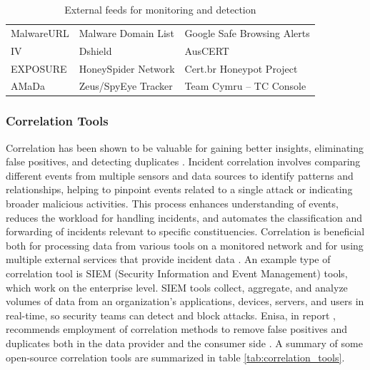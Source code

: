 \begin{table}[ht]
\caption{External feeds for monitoring and detection \cite{noauthor_proactive_nodate}}
\label{tab:detection-tools-ext}
\begin{tabularx}{\textwidth}{XXX}
    \hline
    MalwareURL &
    Malware Domain List &
    Google Safe Browsing Alerts \\
    IV &
    Dshield &
    AusCERT \\
    EXPOSURE &
    HoneySpider Network &
    Cert.br Honeypot Project \\
    AMaDa &
    Zeus/SpyEye Tracker &
    Team Cymru – TC Console \\
\end{tabularx}
\end{table}
\subsubsection{Correlation Tools}
Correlation has been shown to be valuable for gaining better insights, eliminating false positives, and detecting duplicates \cite{skopik_problem_2016}. 
Incident correlation involves comparing different events from multiple sensors and data sources to identify patterns and relationships, helping to pinpoint events related to a single attack or indicating broader malicious activities. 
This process enhances understanding of events, reduces the workload for handling incidents, and automates the classification and forwarding of incidents relevant to specific constituencies. Correlation is beneficial both for processing data from various tools on a monitored network and for using multiple external services that provide incident data \cite{skopik_problem_2016}.
An example type of correlation tool is SIEM (Security Information and Event Management) tools, which work on the enterprise level. 
SIEM tools collect, aggregate, and analyze volumes of data from an organization’s applications, devices, servers, and users in real-time, so security teams can detect and block attacks.
Enisa, in report \cite{noauthor_detect_2013}, recommends employment of correlation methods to remove false positives and duplicates both in the data provider and the consumer side \cite{skopik_problem_2016}. A summary of some open-source correlation tools are summarized in table \ref{tab:correlation_tools}.

